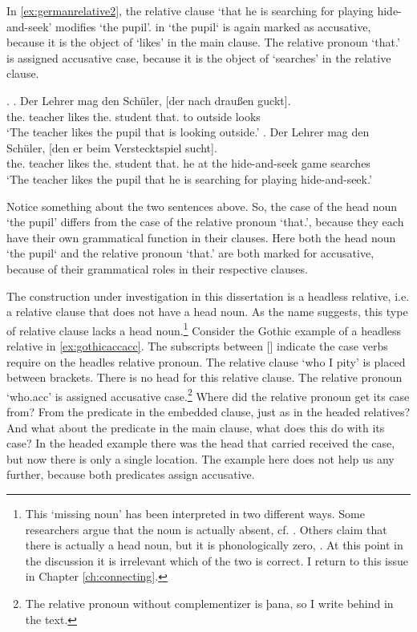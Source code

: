 In \ref{ex:germanrelative2},  the relative clause  `that he is searching for playing hide-and-seek' modifies  `the pupil'.  in  `the pupil` is again marked as accusative, because it is the object of  `likes' in the main clause. The relative pronoun  `that.' is assigned accusative case, because it is the object of  `searches' in the relative clause.

\ex.\label{ex:germanrelatives}
\ag. Der Lehrer mag den Schüler, [der nach draußen guckt].\\
 the. teacher likes the. student that. to outside looks\\
 `The teacher likes the pupil that is looking outside.'\label{ex:germanrelative1}
 \bg. Der Lehrer mag den Schüler, [den er beim Verstecktspiel sucht].\\
 the. teacher likes the. student that. he {at the} {hide-and-seek game} searches\\
 `The teacher likes the pupil that he is searching for playing hide-and-seek.'\label{ex:germanrelative2}

Notice something about the two sentences above.
So, the case of the head noun  `the pupil' differs from the case of the relative pronoun  `that.', because they each have their own grammatical function in their clauses. Here both the head noun  `the pupil` and the relative pronoun  `that.' are both marked for accusative, because of their grammatical roles in their respective clauses.

The construction under investigation in this dissertation is a headless relative, i.e. a relative clause that does not have a head noun. As the name suggests, this type of relative clause lacks a head noun.\footnote{
This `missing noun' has been interpreted in two different ways. Some researchers argue that the noun is actually absent, cf. \citealt{vanriemsdijk2006}. Others claim that there is actually a head noun, but it is phonologically zero, \citealt{himmelreich2017}. At this point in the discussion it is irrelevant which of the two is correct. I return to this issue in Chapter \ref{ch:connecting}.
}
Consider the Gothic example of a headless relative in \ref{ex:gothicaccacc}. The subscripts between [] indicate the case verbs require on the headles relative pronoun.
The relative clause  `who I pity' is placed between brackets. There is no head for this relative clause. The relative pronoun  `who.\ac{acc}' is assigned accusative case.\footnote{
The relative pronoun without complementizer  is þana, so I write  behind  in the text.
}
Where did the relative pronoun get its case from? From the predicate in the embedded clause, just as in the headed relatives? And what about the predicate in the main clause, what does this do with its case? In the headed example there was the head that carried received the case, but now there is only a single location. The example here does not help us any further, because both predicates assign accusative.


